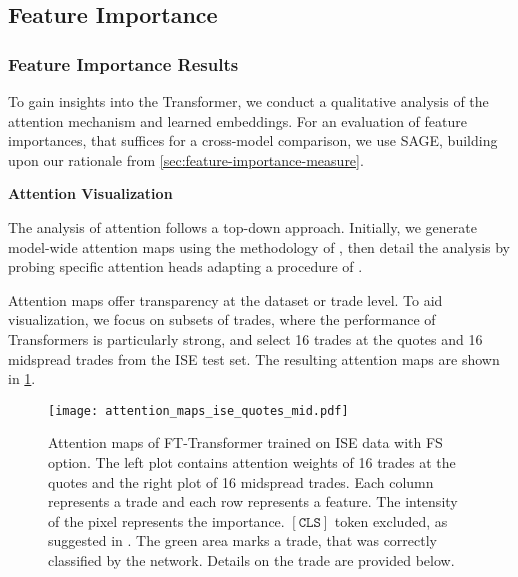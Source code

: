 \subsection{Feature Importance}\label{sec:feature-importance}

\subsubsection{Feature Importance Results}\label{sec:feature-importance-results}

To gain insights into the Transformer, we conduct a qualitative analysis of the attention mechanism and learned embeddings. For an evaluation of feature importances, that suffices for a cross-model comparison, we use \gls{SAGE}, building upon our rationale from \cref{sec:feature-importance-measure}.

\textbf{Attention Visualization}

The analysis of attention follows a top-down approach. Initially, we generate model-wide attention maps using the methodology of \textcite[][784--786]{cheferTransformerInterpretabilityAttention2021}, then detail the analysis by probing specific attention heads adapting a procedure of \textcite[][279]{clarkWhatDoesBERT2019}.

Attention maps offer transparency at the dataset or trade level. To aid visualization, we focus on subsets of trades, where the performance of Transformers is particularly strong, and select \num{16} trades at the quotes and \num{16} midspread trades from the \gls{ISE} test set. The resulting attention maps are shown in \cref{fig:attention-maps-ise}.

\begin{figure}[h!]
    \centering
    \texttt{[image: attention\_maps\_ise\_quotes\_mid.pdf]}
    \caption[Attention Maps of FT-Transformer]{Attention maps of FT-Transformer trained on \gls{ISE} data with \gls{FS} option. The left plot contains attention weights of \num{16} trades at the quotes and the right plot of \num{16} midspread trades. Each column represents a trade and each row represents a feature. The intensity of the pixel represents the importance. $\mathtt{[CLS]}$ token excluded, as suggested in \textcite[][400]{cheferGenericAttentionmodelExplainability2021}. The green area marks a trade, that was correctly classified by the network. Details on the trade are provided below.}
    \label{fig:attention-maps-ise}
\end{figure}

